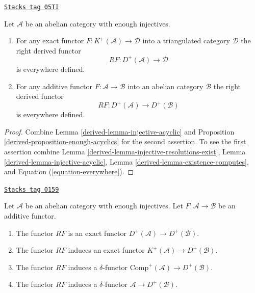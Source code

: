 \begin{lemma}
\label{derived-lemma-enough-injectives-right-derived}
\href{https://stacks.math.columbia.edu/tag/05TI}{\texttt{Stacks tag 05TI}}

Let $\mathcal{A}$ be an abelian category with enough injectives.
\begin{enumerate}
\item For any exact functor $F : K^{+}(\mathcal{A}) \to \mathcal{D}$
into a triangulated category $\mathcal{D}$ the right derived
functor
$$
RF : D^{+}(\mathcal{A}) \longrightarrow \mathcal{D}
$$
is everywhere defined.
\item For any additive functor $F : \mathcal{A} \to \mathcal{B}$ into an
abelian category $\mathcal{B}$ the right derived functor
$$
RF : D^{+}(\mathcal{A}) \longrightarrow D^{+}(\mathcal{B})
$$
is everywhere defined.
\end{enumerate}
\end{lemma}

\begin{proof}

Combine
Lemma \ref{derived-lemma-injective-acyclic}
and
Proposition \ref{derived-proposition-enough-acyclics}
for the second assertion. To see the first assertion combine
Lemma \ref{derived-lemma-injective-resolutions-exist},
Lemma \ref{derived-lemma-injective-acyclic},
Lemma \ref{derived-lemma-existence-computes},
and Equation (\ref{equation-everywhere}).
\end{proof}

\begin{lemma}
\label{derived-lemma-right-derived-properties}
\href{https://stacks.math.columbia.edu/tag/0159}{\texttt{Stacks tag 0159}}

Let $\mathcal{A}$ be an abelian category with enough injectives.
Let $F : \mathcal{A} \to \mathcal{B}$ be an additive functor.
\begin{enumerate}
\item The functor $RF$ is an exact functor
$D^{+}(\mathcal{A}) \to D^{+}(\mathcal{B})$.
\item The functor $RF$ induces an exact functor
$K^{+}(\mathcal{A}) \to D^{+}(\mathcal{B})$.
\item The functor $RF$ induces a $\delta$-functor
$\text{Comp}^{+}(\mathcal{A}) \to D^{+}(\mathcal{B})$.
\item The functor $RF$ induces a $\delta$-functor
$\mathcal{A} \to D^{+}(\mathcal{B})$.
\end{enumerate}
\end{lemma}

